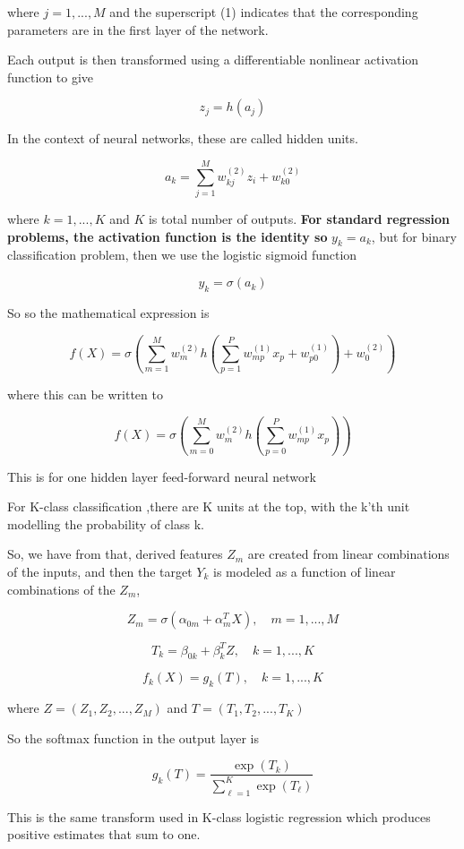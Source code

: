 where $j  = 1,...,M$ and the superscript (1) indicates that the corresponding parameters are in the first layer of the network.

Each output is then transformed using a differentiable nonlinear activation function to give

\[
    z_j = h(a_j)
\]

In the context of neural networks, these are called hidden units.

\[
    a_k = \sum_{j = 1}^{M} w_{kj}^{(2)} z_i + w_{k0}^{(2)}
\]

where $k=1,...,K$ and $K$ is total number of outputs. \textbf{For standard regression problems, the activation function is the identity so} $y_k =a_k$, but for binary classification problem, then we use the logistic sigmoid function

\[
    y_k = \sigma (a_k)
\]

So so the mathematical expression is

\[
    f(X) = \sigma\left( \sum_{m=1}^{M}  w_{m}^{(2)} h \left( \sum_{p=1}^{P} w_{mp}^{(1)} x_p + w_{p0}^{(1)}  \right) + w_{0}^{(2)}  \right)
\]

where this can be written to

\[
    f(X) = \sigma\left( \sum_{m=0}^{M}  w_{m}^{(2)} h \left( \sum_{p=0}^{P} w_{mp}^{(1)} x_p   \right)   \right)
\]

This is for one hidden layer feed-forward neural network \cite[p.~7]{lecture12}

For K-class classification ,there are K units at the top, with the k'th unit modelling the probability of class k.

So, we have from \cite[p.~392]{friedman2016elements} that, derived features $Z_m$ are created from linear combinations of the inputs,
and then the target $Y_k$ is modeled as a function of linear combinations of the $Z_m$,

\[
    Z_m = \sigma (\alpha_{0m} + \alpha_m^T X), \quad m=1,...,M
\]

\[
    T_k = \beta_{0k} + \beta_k^T Z, \quad k=1,...,K
\]

\[
    f_k(X) = g_k(T), \quad k=1,...,K
\]

where $Z = (Z_1, Z_2, ... , Z_M)$ and $T = (T_1, T_2, ... , T_K)$

So the softmax function in the output layer is

\[
    g_k (T) = \frac{\exp(T_k)}{\sum_{\ell = 1}^{K} \exp(T_\ell)}
\]

This is the same transform used in K-class logistic regression which produces positive estimates that sum to one.

